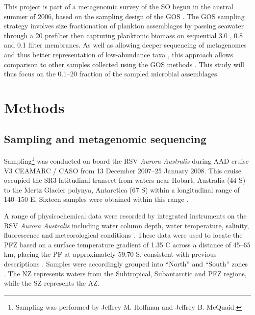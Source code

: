 This project is part of a metagenomic survey of the \ac{SO} begun in the austral summer of 2006, based on the sampling design of the \ac{GOS} \cite{Rusch:2007ez}.
The \ac{GOS} sampling strategy involves size fractionation of plankton assemblages by passing seawater through a 20 \micron{} prefilter then capturing planktonic biomass on sequential 3.0 \micron{}, 0.8 \micron{} and 0.1 \micron{} filter membranes.
As well as allowing deeper sequencing of metagenomes and thus better representation of low-abundance taxa \cite{Rusch:2007ez}, this approach allows comparison to other samples collected using the \ac{GOS} methods \citep[e.g.][]{Brown:2012gna}.
This study will thus focus on the 0.1--20 \micron{} fraction of the sampled microbial assemblages.

\section{Methods}
\subsection{Sampling and metagenomic sequencing}

Sampling\footnote{Sampling was performed by Jeffrey M. Hoffman and Jeffrey B. McQuaid.} was conducted on board the RSV \emph{Aurora Australis} during \ac{AAD} cruise V3 \ac{CEAMARC} / \ac{CASO} from 13 December 2007--25 January 2008. 
This cruise occupied the SR3 latitudinal transect from waters near Hobart, Australia (\textapprox{}44\textdegree{} S) to the Mertz Glacier polynya, Antarctica (\textapprox{}67\textdegree{} S) within a longitudinal range of \textapprox{}140--150\textdegree{} E.
Sixteen samples were obtained within this range .



A range of physicochemical data were recorded by integrated instruments on the RSV \emph{Aurora Australis} including water column depth, water temperature, salinity, fluorescence and meteorological conditions .
These data were used to locate the \ac{PFZ} based on a surface temperature gradient of \textapprox{}1.35 \textdegree{}C across a distance of 45--65 km, placing the \ac{PF} at approximately 59.70\textdegree{} S, consistent with previous descriptions \cite{Moore:1999to,Sokolov:2002tc}.
Samples were accordingly grouped into ``North'' and ``South'' zones .
The \ac{NZ} represents waters from the Subtropical, Subantarctic and \ac{PFZ} regions, while the \ac{SZ} represents the \ac{AZ}.

